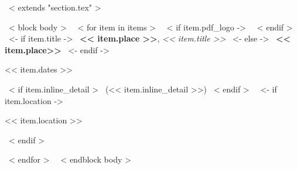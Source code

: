 ~< extends "section.tex" >~

~< block body >~
~< for item in items >~
    ~< if item.pdf_logo ->~
    ~< endif >~
    ~<- if item.title ->~
    \textbf{<< item.place >>}, \emph{<< item.title >>}
    ~<- else ->~
    \textbf{<< item.place>>}
    ~<- endif ->~
    \hfill{ << item.dates >> \par}
    ~< if item.inline_detail >~
    {\footnotesize \color{gray} (<< item.inline_detail >>)}
    ~< endif >~
    \hfill
    ~<- if item.location ->~
    {\footnotesize \color{gray} << item.location >> \par}
    ~< endif >~ \par\vspace{1mm}
~< endfor >~
\vspace{-3mm}
~< endblock body >~